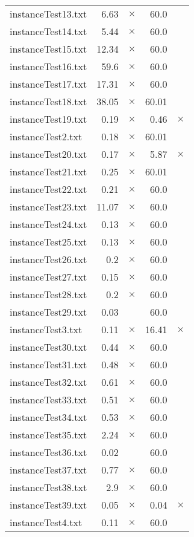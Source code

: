 \documentclass{article}
\begin{document}
\begin{center}
\begin{tabular}{lrrrr}
instanceTest13.txt & 6.63 & 
$\times$
 & 60.0 & 
\\
instanceTest14.txt & 5.44 & 
$\times$
 & 60.0 & 
\\
instanceTest15.txt & 12.34 & 
$\times$
 & 60.0 & 
\\
instanceTest16.txt & 59.6 & 
$\times$
 & 60.0 & 
\\
instanceTest17.txt & 17.31 & 
$\times$
 & 60.0 & 
\\
instanceTest18.txt & 38.05 & 
$\times$
 & 60.01 & 
\\
instanceTest19.txt & 0.19 & 
$\times$
 & 0.46 & 
$\times$
\\
instanceTest2.txt & 0.18 & 
$\times$
 & 60.01 & 
\\
instanceTest20.txt & 0.17 & 
$\times$
 & 5.87 & 
$\times$
\\
instanceTest21.txt & 0.25 & 
$\times$
 & 60.01 & 
\\
instanceTest22.txt & 0.21 & 
$\times$
 & 60.0 & 
\\
instanceTest23.txt & 11.07 & 
$\times$
 & 60.0 & 
\\
instanceTest24.txt & 0.13 & 
$\times$
 & 60.0 & 
\\
instanceTest25.txt & 0.13 & 
$\times$
 & 60.0 & 
\\
instanceTest26.txt & 0.2 & 
$\times$
 & 60.0 & 
\\
instanceTest27.txt & 0.15 & 
$\times$
 & 60.0 & 
\\
instanceTest28.txt & 0.2 & 
$\times$
 & 60.0 & 
\\
instanceTest29.txt & 0.03 & 
 & 60.0 & 
\\
instanceTest3.txt & 0.11 & 
$\times$
 & 16.41 & 
$\times$
\\
instanceTest30.txt & 0.44 & 
$\times$
 & 60.0 & 
\\
instanceTest31.txt & 0.48 & 
$\times$
 & 60.0 & 
\\
instanceTest32.txt & 0.61 & 
$\times$
 & 60.0 & 
\\
instanceTest33.txt & 0.51 & 
$\times$
 & 60.0 & 
\\
instanceTest34.txt & 0.53 & 
$\times$
 & 60.0 & 
\\
instanceTest35.txt & 2.24 & 
$\times$
 & 60.0 & 
\\
instanceTest36.txt & 0.02 & 
 & 60.0 & 
\\
instanceTest37.txt & 0.77 & 
$\times$
 & 60.0 & 
\\
instanceTest38.txt & 2.9 & 
$\times$
 & 60.0 & 
\\
instanceTest39.txt & 0.05 & 
$\times$
 & 0.04 & 
$\times$
\\
instanceTest4.txt & 0.11 & 
$\times$
 & 60.0 & 
\\
\hline\end{tabular}
\end{center}
\end{document}
